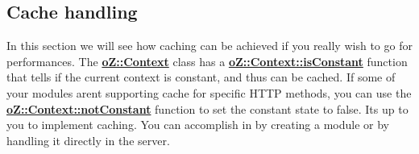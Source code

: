 \subsection*{Cache handling}

In this section we will see how caching can be achieved if you really wish to go for performances. The {\bfseries{\mbox{\hyperlink{classo_z_1_1_context}{o\+Z\+::\+Context}}}} class has a {\bfseries{\mbox{\hyperlink{classo_z_1_1_context_a748147258019436983fdbbf6ed51c0b6}{o\+Z\+::\+Context\+::is\+Constant}}}} function that tells if the current context is constant, and thus can be cached. If some of your modules aren\textquotesingle{}t supporting cache for specific H\+T\+TP methods, you can use the {\bfseries{\mbox{\hyperlink{classo_z_1_1_context_ada521ec57fbc2febfd61177e8bbc0128}{o\+Z\+::\+Context\+::not\+Constant}}}} function to set the constant state to false. It\textquotesingle{}s up to you to implement caching. You can accomplish in by creating a module or by handling it directly in the server. 
